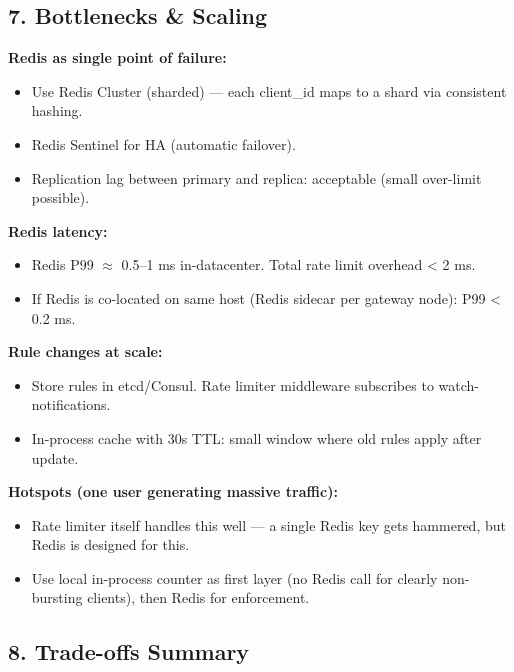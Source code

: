 \documentclass[11pt]{article}
\providecommand{\tightlist}{\setlength{\itemsep}{1pt}\setlength{\parskip}{0pt}}
\begin{document}
\subsection{7. Bottlenecks \& Scaling}\label{7-bottlenecks--scaling-1}

\textbf{Redis as single point of failure:}

\begin{itemize}
\tightlist
\item
  Use Redis Cluster (sharded) --- each client\_id maps to a shard via consistent hashing.
\item
  Redis Sentinel for HA (automatic failover).
\item
  Replication lag between primary and replica: acceptable (small over-limit possible).
\end{itemize}

\textbf{Redis latency:}

\begin{itemize}
\tightlist
\item
  Redis P99 \(\approx\) 0.5--1 ms in-datacenter. Total rate limit overhead \textless{} 2 ms.
\item
  If Redis is co-located on same host (Redis sidecar per gateway node): P99 \textless{} 0.2 ms.
\end{itemize}

\textbf{Rule changes at scale:}

\begin{itemize}
\tightlist
\item
  Store rules in etcd/Consul. Rate limiter middleware subscribes to watch-notifications.
\item
  In-process cache with 30s TTL: small window where old rules apply after update.
\end{itemize}

\textbf{Hotspots (one user generating massive traffic):}

\begin{itemize}
\tightlist
\item
  Rate limiter itself handles this well --- a single Redis key gets hammered, but Redis is designed for this.
\item
  Use local in-process counter as first layer (no Redis call for clearly non-bursting clients), then Redis for enforcement.
\end{itemize}

\subsection{8. Trade-offs Summary}\label{8-trade-offs-summary-1}
\end{document}
